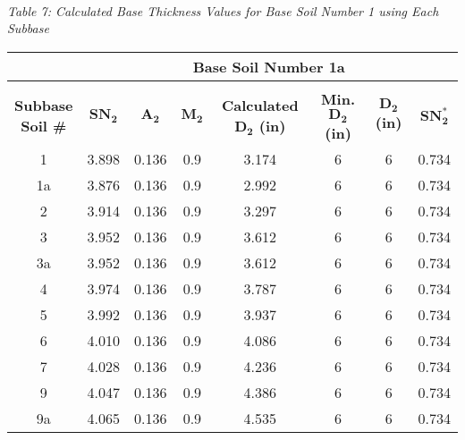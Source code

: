 \documentclass{article}
\begin{document}
\begin{center}
\begin{spacing}{1.6}
        \vspace{3mm}
        \emph{\\Table 7: Calculated Base Thickness Values for Base Soil Number 1 using Each Subbase\\}
        \vspace{7mm}
        \begin{tabular}{|c|ccccccc|}
            \hline    
            \multicolumn{1}{|l}{}                     & \multicolumn{7}{c|}{\textbf{Base Soil Number 1a}}                                              \\\hline
            &&&&&&&\\
             \shortstack[c]{\textbf{Subbase}\\\textbf{Soil \#}} & $\bm{SN_2}$ & $\bm{A_2}$ & $\bm{M_2}$ & \textbf{Calculated $\bm{D_2}$ (in)} & \textbf{Min. $\bm{D_2}$ (in)} & \textbf{$\bm{D_2}$ (in)} & $\bm{SN_2^*}$  \\\hline
                                            1  & 3.898 & 0.136 & 0.9 & 3.174 & 6 & 6 & 0.734  \\
                                            1a & 3.876 & 0.136 & 0.9 & 2.992 & 6 & 6 & 0.734  \\
                                            2  & 3.914 & 0.136 & 0.9 & 3.297 & 6 & 6 & 0.734  \\
                                            3  & 3.952 & 0.136 & 0.9 & 3.612 & 6 & 6 & 0.734  \\
                                            3a & 3.952 & 0.136 & 0.9 & 3.612 & 6 & 6 & 0.734  \\
                                            4  & 3.974 & 0.136 & 0.9 & 3.787 & 6 & 6 & 0.734  \\
                                            5  & 3.992 & 0.136 & 0.9 & 3.937 & 6 & 6 & 0.734  \\
                                            6  & 4.010 & 0.136 & 0.9 & 4.086 & 6 & 6 & 0.734  \\
                                            7  & 4.028 & 0.136 & 0.9 & 4.236 & 6 & 6 & 0.734  \\
                                            9  & 4.047 & 0.136 & 0.9 & 4.386 & 6 & 6 & 0.734  \\
                                            9a & 4.065 & 0.136 & 0.9 & 4.535 & 6 & 6 & 0.734  \\

\end{tabular}
\end{spacing}
\end{center}
\end{document}
